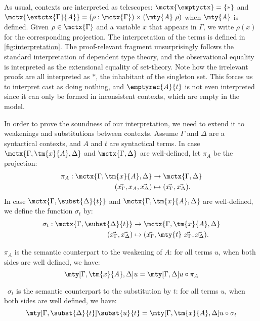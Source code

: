 As usual, contexts are interpreted as telescopes:
\( \mctx{\emptyctx} = \{ * \} \) and
\( \mctx{\extctx{\Gamma}{A}} = (\rho : \mctx{\Gamma})\times (\mty{A}\ \rho) \)
when \( \mty{A} \) is defined.
%
Given \( \rho \in \mctx{\Gamma} \) and a variable \( x \) that appears in
\( \Gamma \), we write \( \rho(x) \) for the corresponding projection.
%
The interpretation of the terms is defined in
\cref{fig:interpretation}. The proof-relevant fragment unsurprisingly
follows the standard interpretation of dependent type theory, and the
observational equality is interpreted as the extensional equality of
set-theory.
%
Note how the irrelevant proofs are all interpreted as \( * \), the inhabitant
of the singleton set. This forces us to interpret cast as doing nothing, and \( \emptyrec{A}{t} \) is not even interpreted since it can only be formed in inconsistent contexts, which are empty in the model.

In order to prove the soundness of our interpretation, we need to extend it to weakenings
and substitutions between contexts.
%
Assume \( \Gamma \) and \( \Delta \) are a syntactical contexts, and \( A \) and \( t \)
are syntactical terms.
%
In case \( \mctx{\Gamma, \tm{x}{A}, \Delta} \) and \( \mctx{\Gamma, \Delta} \) are well-defined,
let \( \pi_A \) be the projection:
{\small
\[
  \begin{split}
  \pi_A : \mctx{\Gamma, \tm{x}{A}, \Delta} & \to \mctx{\Gamma, \Delta} \\
  (\vec{x_\Gamma}, x_A, \vec{x_\Delta}) & \mapsto (\vec{x_\Gamma}, \vec{x_\Delta}).
  \end{split}
\]
}
In case \( \mctx{\Gamma, \subst{\Delta}{t}} \) and \( \mctx{\Gamma, \tm{x}{A}, \Delta} \) are
well-defined, we define the function \( \sigma_t \) by:
{\small
\[
  \begin{split}
    \sigma_t : \mctx{\Gamma, \subst{\Delta}{t}} & \to \mctx{\Gamma, \tm{x}{A}, \Delta} \\
    (\vec{x_\Gamma}, \vec{x_\Delta}) & \mapsto (\vec{x_\Gamma}, \mty{t}\ \vec{x_\Gamma}, \vec{x_\Delta}).
  \end{split}
\]
}
%
\begin{lemma}[Weakening]\label{lem:weakening}
  \( \pi_A \) is the semantic counterpart to the weakening of \( A \): for all terms \( u \),
  when both sides are well defined, we have:
  {\small
\[
    \mty[{\Gamma, \tm{x}{A}, \Delta}]{u} = \mty[{\Gamma, \Delta}]{u} \circ \pi_A
  \]}
\end{lemma}
%
\begin{lemma}[Substitution]\label{lem:substitution}\ \( \sigma_t \) is the semantic counterpart to the substitution by \( t \):
  for all terms \( u \), when both sides are well defined, we have:
  {\small
\[
    \mty[{\Gamma, \subst{\Delta}{t}}]{\subst{u}{t}} = \mty[{\Gamma, \tm{x}{A}, \Delta}]{u} \circ \sigma_t
  \]}
\end{lemma}

